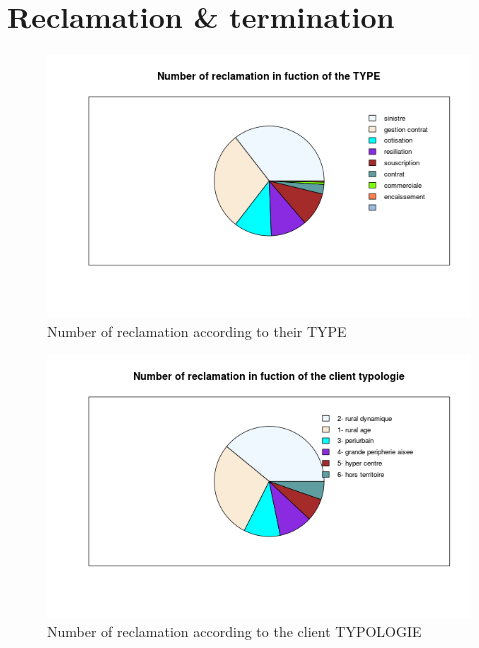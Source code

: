 \documentclass[a4paper, 11pt]{article}
\begin{document}
        
\clearpage
\section{Reclamation \& termination}
        \begin{figure}[!ht]
        	\centering
                \includegraphics[height = 10 cm]{Valentin/Number_of_reclamation_in_fuction_of_the_TYPE.png}
                \caption{Number of reclamation according to their TYPE}
                \label{fig:reclamtion_type}
        \end{figure}
        
        \begin{figure}[!ht]
        	\centering
                \includegraphics[height = 10 cm]{Valentin/Number_of_reclamation_in_fuction_of_the_client_typologie.png}
                \caption{Number of reclamation according to the client TYPOLOGIE}
                \label{fig:reclamtion_typo}
        \end{figure}
        
\end{document}
